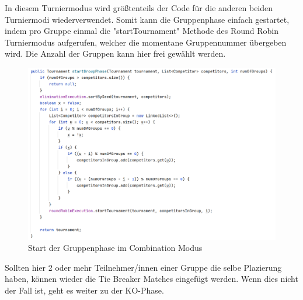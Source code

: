 In diesem Turniermodus wird größtenteils der Code für die anderen beiden Turniermodi wiederverwendet. Somit kann die Gruppenphase einfach gestartet, 
indem pro Gruppe einmal die "startTournament" Methode des Round Robin Turniermodus aufgerufen, welcher die momentane Gruppennummer übergeben wird. 
Die Anzahl der Gruppen kann hier frei gewählt werden.

\begin{figure}[H]
    \includegraphics[scale=0.4]{pics/backend/combination/combination_startGroupPhase.png}
    \caption{Start der Gruppenphase im Combination Modus}
\end{figure}



Sollten hier 2 oder mehr Teilnehmer/innen einer Gruppe die selbe Plazierung haben, können wieder die Tie Breaker Matches eingefügt werden.
Wenn dies nicht der Fall ist, geht es weiter zu der KO-Phase.